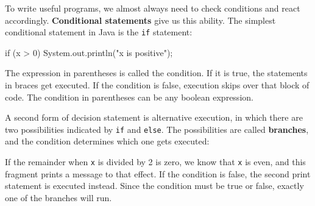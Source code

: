 \documentclass[12pt]{book}
\theoremstyle{exercise}
\newcommand{\java}[1]{\verb"#1"}
\newcommand{\java}[1]{\lstinline{#1}} %
\begin{document}
To write useful programs, we almost always need to check conditions and react accordingly.
{\bf Conditional statements} give us this ability.
The simplest conditional statement in Java is the \java{if} statement:

\begin{code}
    if (x > 0) {
        System.out.println("x is positive");
    }
\end{code}

The expression in parentheses is called the condition.
If it is true, the statements in braces get executed.
If the condition is false, execution skips over that block of code.
The condition in parentheses can be any boolean expression.


A second form of decision statement is alternative execution, in which there are two possibilities indicated by \java{if} and \java{else}.
The possibilities are called {\bf branches}, and the condition determines which one gets executed:


If the remainder when \java{x} is divided by 2 is zero, we know that \java{x} is even, and this fragment prints a message to that effect.
If the condition is false, the second print statement is executed instead.
Since the condition must be true or false, exactly one of the branches will run.

%
%
%
%
%
%
\end{document}
